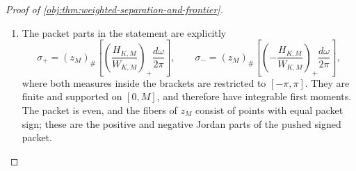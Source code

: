 \begin{proof}[Proof of \cref{obj:thm:weighted-separation-and-frontier}]
\begin{enumerate}
We next verify the normalization over the whole parameter range. The nonnegative Jackson kernel has a strict maximum at the periodic origin: the geometric-sum representation of \(D_N\) gives
\[
|D_N(\omega)|<N
\quad\text{when }\cos\omega<1,
\qquad
|D_N(0)|=N.
\]
Since \(\cos(2\vartheta_M)<1\),
\[
H_{K,M}(\vartheta_M)
=\mathcal J_N(0)
 +\mathcal J_N(2\vartheta_M)\cos(8N\vartheta_M)
\ge\mathcal J_N(0)-\mathcal J_N(2\vartheta_M)>0.
\]
Continuity and nonnegativity of the integrand defining \(W_{K,M}\) therefore give \(W_{K,M}>0\).

For the upper bound, use
\[
|H_{K,M}(\omega)|
\le
\mathcal J_N(\omega-\vartheta_M)
+\mathcal J_N(\omega+\vartheta_M)
\]
and the identity
\[
z_M(\omega+\vartheta_M)+z_M(\omega-\vartheta_M)
=2+(M-2)(1-\cos\omega).
\]
After translating the two periodic integrals,
\[
\begin{aligned}
W_{K,M}
&\le
\int_{-\pi}^{\pi}
\{4+(M-2)(1-\cos\omega)\}J_N^{\mathrm J}(\omega)\,d\omega\\
&\le
4+\frac{M-2}{2}
 \int_{-\pi}^{\pi}\omega^2J_N^{\mathrm J}(\omega)\,d\omega\\
&\le4+\frac{32(M-2)}{N^2}
\le36.
\end{aligned}
\]
Define
\[
c_{\mathrm p}=\frac{c_{\mathrm{loc}}}{576\pi A_0}>0.
\]
Dividing the packet response by \(W_{K,M}\le36\) proves
\[
\left|
\int_{-\pi}^{\pi}
\phi_\epsilon\{z_M(\omega)\}
\frac{H_{K,M}(\omega)}{W_{K,M}}\,
\frac{d\omega}{2\pi}
\right|
\ge c_{\mathrm p}\frac{\sqrt M}{K}.
\]

\item
The packet parts in the statement are explicitly
\[
\sigma_+
=(z_M)_\#
\left[
\left(\frac{H_{K,M}}{W_{K,M}}\right)_+
\frac{d\omega}{2\pi}
\right],
\qquad
\sigma_-
=(z_M)_\#
\left[
\left(-\frac{H_{K,M}}{W_{K,M}}\right)_+
\frac{d\omega}{2\pi}
\right],
\]
where both measures inside the brackets are restricted to
\([-\pi,\pi]\). They are finite and supported on \([0,M]\), and therefore have integrable first moments. The packet is even, and the fibers of \(z_M\) consist of points with equal packet sign; these are the positive and negative Jordan parts of the pushed signed packet.


\end{enumerate}
\end{proof}

